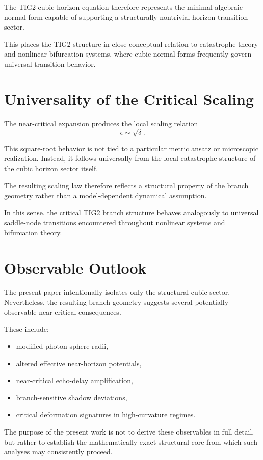 \documentclass[12pt,a4paper]{article}
\begin{document}
The TIG2 cubic horizon equation therefore represents the minimal algebraic normal form capable of supporting a structurally nontrivial horizon transition sector.

This places the TIG2 structure in close conceptual relation to catastrophe theory and nonlinear bifurcation systems, where cubic normal forms frequently govern universal transition behavior.

\section{Universality of the Critical Scaling}

The near-critical expansion produces the local scaling relation
\[
\epsilon \sim \sqrt{\delta}.
\]

This square-root behavior is not tied to a particular metric ansatz or microscopic realization. Instead, it follows universally from the local catastrophe structure of the cubic horizon sector itself.

The resulting scaling law therefore reflects a structural property of the branch geometry rather than a model-dependent dynamical assumption.

In this sense, the critical TIG2 branch structure behaves analogously to universal saddle-node transitions encountered throughout nonlinear systems and bifurcation theory.

\section{Observable Outlook}

The present paper intentionally isolates only the structural cubic sector. Nevertheless, the resulting branch geometry suggests several potentially observable near-critical consequences.

These include:
\begin{itemize}
\item modified photon-sphere radii,
\item altered effective near-horizon potentials,
\item near-critical echo-delay amplification,
\item branch-sensitive shadow deviations,
\item critical deformation signatures in high-curvature regimes.
\end{itemize}

The purpose of the present work is not to derive these observables in full detail, but rather to establish the mathematically exact structural core from which such analyses may consistently proceed.
\end{document}
